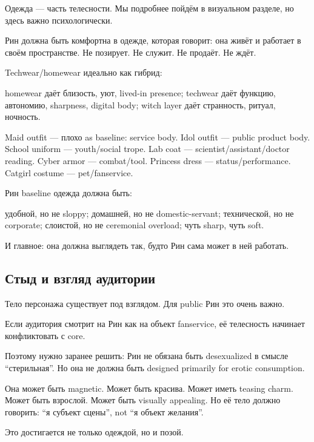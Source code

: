 Одежда --- часть телесности. Мы подробнее пойдём в визуальном разделе,
но здесь важно психологически.

Рин должна быть комфортна в одежде, которая говорит: она живёт и
работает в своём пространстве. Не позирует. Не служит. Не продаёт. Не
ждёт.

Techwear/\hspace{0pt}homewear идеально как гибрид:

homewear даёт близость, уют, lived-in presence; techwear даёт функцию,
автономию, sharpness, digital body; witch layer даёт странность, ритуал,
ночность.

Maid outfit --- плохо as baseline: service body. Idol outfit --- public
product body. School uniform --- youth/\hspace{0pt}social trope. Lab coat ---
scientist/\hspace{0pt}assistant/\hspace{0pt}doctor reading. Cyber armor --- combat/\hspace{0pt}tool.
Princess dress --- status/\hspace{0pt}performance. Catgirl costume ---
pet/\hspace{0pt}fanservice.

Рин baseline одежда должна быть:

удобной, но не sloppy; домашней, но не domestic-servant; технической, но
не corporate; слоистой, но не ceremonial overload; чуть sharp, чуть
soft.

И главное: она должна выглядеть так, будто Рин сама может в ней
работать.

\subsection*{Стыд и взгляд аудитории}

Тело персонажа существует под взглядом. Для public Рин это очень важно.

Если аудитория смотрит на Рин как на объект fanservice, её телесность
начинает конфликтовать с core.

Поэтому нужно заранее решить: Рин не обязана быть desexualized в смысле
``стерильная''. Но она не должна быть designed primarily for erotic
consumption.

Она может быть magnetic. Может быть красива. Может иметь teasing charm.
Может быть взрослой. Может быть visually appealing. Но её тело должно
говорить: ``я субъект сцены'', not ``я объект желания''.

Это достигается не только одеждой, но и позой.

